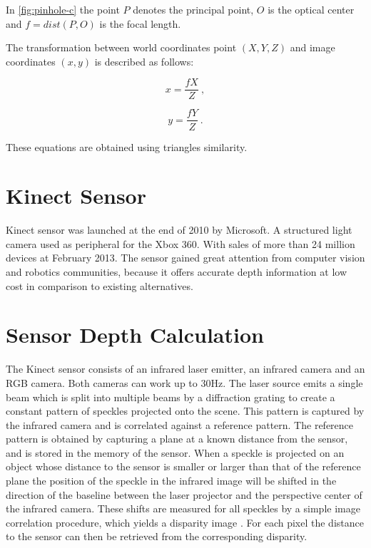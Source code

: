 In \ref{fig:pinhole-c} the point $P$ denotes the principal point, $O$ is the optical center and 
$f=dist(P,O)$ is the focal length.

The transformation between world coordinates point $(X,Y,Z)$ and image coordinates $(x,y)$ is described as 
follows:

\begin{equation}
\label{eq:disparity2}
 x = \frac{fX}{Z}\ ,
\end{equation}

\begin{equation}
\label{eq:disparity2}
 y = \frac{fY}{Z}\ .
\end{equation}

These equations are  obtained using triangles similarity.

\section{Kinect Sensor}

Kinect sensor was launched at the end of 2010 by Microsoft. A structured light camera 
used as peripheral for the Xbox 360. With sales of more than 24 million devices at February 2013.
The sensor gained great attention from computer vision and robotics communities, because it offers 
accurate depth information at low cost in comparison to existing alternatives.

\section{Sensor Depth Calculation}

The Kinect sensor consists of an infrared laser emitter, an 
infrared camera and an RGB camera. Both cameras can work up to 30Hz. 
The laser source emits a single 
beam which is split into multiple beams by a diffraction 
grating to create a constant 
pattern of speckles projected onto the scene. This pattern is 
captured by the infrared camera and is correlated against a 
reference pattern. The reference pattern is obtained by capturing 
a plane at a known distance from the sensor, and is stored in the 
memory of the sensor. When a speckle is projected on an object 
whose distance to the sensor is smaller or larger than that of the 
reference plane the position of the speckle in the infrared image 
will be shifted in the direction of the baseline between the laser 
projector and the perspective center of the infrared camera. 
These shifts are measured for all speckles by a simple image 
correlation procedure, which yields a disparity image \cite{khoshelham2011accuracy}. For each 
pixel the distance to the sensor can then be retrieved from the 
corresponding disparity.



